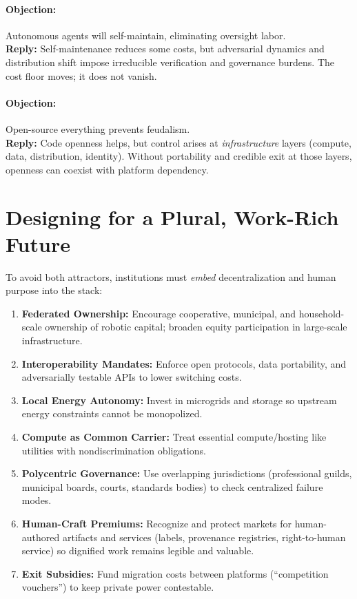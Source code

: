 \documentclass[12pt]{article}
\begin{document}
\paragraph{Objection:} Autonomous agents will self-maintain, eliminating oversight labor.\\
\textbf{Reply:} Self-maintenance reduces some costs, but adversarial dynamics and distribution shift impose irreducible verification and governance burdens. The cost floor moves; it does not vanish.

\paragraph{Objection:} Open-source everything prevents feudalism.\\
\textbf{Reply:} Code openness helps, but control arises at \emph{infrastructure} layers (compute, data, distribution, identity). Without portability and credible exit at those layers, openness can coexist with platform dependency.

\section{Designing for a Plural, Work-Rich Future}
To avoid both attractors, institutions must \emph{embed} decentralization and human purpose into the stack:

\begin{enumerate}[leftmargin=1.2em]
  \item \textbf{Federated Ownership:} Encourage cooperative, municipal, and household-scale ownership of robotic capital; broaden equity participation in large-scale infrastructure.
  \item \textbf{Interoperability Mandates:} Enforce open protocols, data portability, and adversarially testable APIs to lower switching costs.
  \item \textbf{Local Energy Autonomy:} Invest in microgrids and storage so upstream energy constraints cannot be monopolized.
  \item \textbf{Compute as Common Carrier:} Treat essential compute/hosting like utilities with nondiscrimination obligations.
  \item \textbf{Polycentric Governance:} Use overlapping jurisdictions (professional guilds, municipal boards, courts, standards bodies) to check centralized failure modes.
  \item \textbf{Human-Craft Premiums:} Recognize and protect markets for human-authored artifacts and services (labels, provenance registries, right-to-human service) so dignified work remains legible and valuable.
  \item \textbf{Exit Subsidies:} Fund migration costs between platforms (``competition vouchers'') to keep private power contestable.
\end{enumerate}
\end{document}
